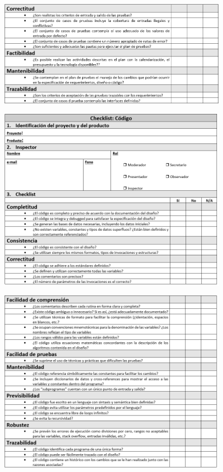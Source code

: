 \begin{figure}[H]
\centering
\includegraphics[width=1\textwidth]{figures/anexos/3-2-4b.PNG}
\end{figure}

\begin{figure}[H]
\centering
\includegraphics[width=1\textwidth]{figures/anexos/3-2-5a.PNG}
\end{figure}

\begin{figure}[H]
\centering
\includegraphics[width=1\textwidth]{figures/anexos/3-2-5b.PNG}
\end{figure}

